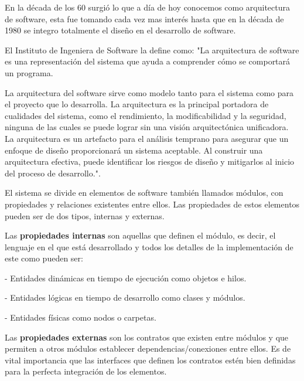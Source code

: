 \documentclass[12pt]{report} %
\begin{document}
	En la década de los 60 surgió lo que a día de hoy conocemos como arquitectura de software, esta fue tomando cada vez mas interés hasta que en la década de 1980 se integro totalmente el diseño en el desarrollo de software. 
	
	El Instituto de Ingeniera de Software la define como:
	"La arquitectura de software es una representación del sistema que ayuda a comprender cómo se comportará un programa. 
	
	La arquitectura del software sirve como modelo tanto para el sistema como para el proyecto que lo desarrolla. La arquitectura es la principal portadora de cualidades del sistema, como el rendimiento, la modificabilidad y la seguridad, ninguna de las cuales se puede lograr sin una visión arquitectónica unificadora. La arquitectura es un artefacto para el análisis temprano para asegurar que un enfoque de diseño proporcionará un sistema aceptable. Al construir una arquitectura efectiva, puede identificar los riesgos de diseño y mitigarlos al inicio del proceso de desarrollo."\cite{SoftwareEngineeringInstitute}. 
	
	El sistema se divide en elementos de software también llamados módulos, con propiedades y relaciones existentes entre ellos. Las propiedades de estos elementos pueden ser de dos tipos, internas y externas.
	
	Las \textbf{propiedades internas}  son aquellas que definen el módulo, es decir, el lenguaje en el que está desarrollado y todos los detalles de la implementación de este como pueden ser:
	
	- Entidades dinámicas en tiempo de ejecución como objetos e hilos.
	
	- Entidades lógicas en tiempo de desarrollo como clases y módulos.
	
	- Entidades físicas como nodos o carpetas.	
	
	Las \textbf{propiedades externas} son los contratos que existen entre módulos y que permiten a otros módulos establecer dependencias/conexiones entre ellos. Es de vital importancia que las interfaces que definen los contratos estén bien definidas para la perfecta integración de los elementos.
	
\end{document}
